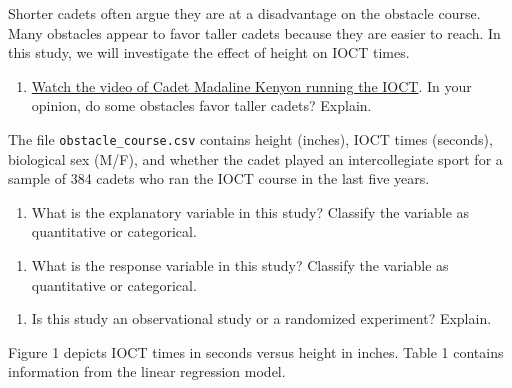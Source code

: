 \documentclass[]{book}
\providecommand{\tightlist}{%
  \setlength{\itemsep}{0pt}\setlength{\parskip}{0pt}}
\begin{document}
Shorter cadets often argue they are at a disadvantage on the obstacle course. Many obstacles appear to favor taller cadets because they are easier to reach. In this study, we will investigate the effect of height on IOCT times.

\begin{enumerate}
\def\labelenumi{\arabic{enumi}.}
\tightlist
\item
  \href{https://www.youtube.com/watch?v=94tPO0fGtJo\&t=77s}{Watch the video of Cadet Madaline Kenyon running the IOCT}. In your opinion, do some obstacles favor taller cadets? Explain.
\end{enumerate}

\vspace{1in}

The file \texttt{obstacle\_course.csv} contains height (inches), IOCT times (seconds), biological sex (M/F), and whether the cadet played an intercollegiate sport for a sample of 384 cadets who ran the IOCT course in the last five years.

\begin{enumerate}
\def\labelenumi{\arabic{enumi}.}
\setcounter{enumi}{1}
\tightlist
\item
  What is the explanatory variable in this study? Classify the variable as quantitative or categorical.
\end{enumerate}

\vspace{0.25in}

\begin{enumerate}
\def\labelenumi{\arabic{enumi}.}
\setcounter{enumi}{2}
\tightlist
\item
  What is the response variable in this study? Classify the variable as quantitative or categorical.
\end{enumerate}

\vspace{0.25in}

\begin{enumerate}
\def\labelenumi{\arabic{enumi}.}
\setcounter{enumi}{3}
\tightlist
\item
  Is this study an observational study or a randomized experiment? Explain.
\end{enumerate}

\vspace{1in}

\newpage

Figure 1 depicts IOCT times in seconds versus height in inches. Table 1 contains information from the linear regression model.
\end{document}
